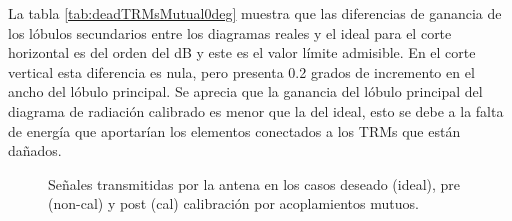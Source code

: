 La tabla \ref{tab:deadTRMsMutual0deg} muestra que las diferencias de ganancia de los lóbulos secundarios entre los diagramas 
reales y el ideal para el corte horizontal es del orden del dB y este es el valor límite admisible. En el corte vertical esta 
diferencia es nula, pero presenta 0.2 grados de incremento en el ancho del lóbulo principal. Se aprecia que la ganancia del 
lóbulo principal del diagrama de radiación calibrado es menor que la del ideal, esto se debe a la falta de energía que 
aportarían los elementos conectados a los TRMs que están dañados.

\begin{figure}[H]
	\centering

	\caption{Señales transmitidas por la antena en los casos deseado (ideal), pre (non-cal) y post (cal) calibración por acoplamientos mutuos.}
	\label{fig:deadTRMsMutual0deg}
\end{figure}
